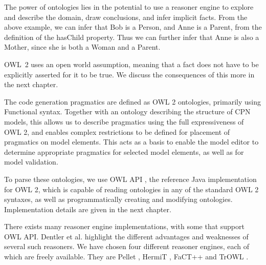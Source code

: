 The power of ontologies lies in the potential to use a reasoner engine to
explore and describe the domain, draw conclusions, and infer implicit facts.
From the above example, we can infer that Bob is a Person, and Anne is a Parent,
from the definition of the hasChild property. Thus we can further infer that
Anne is also a Mother, since she is both a Woman and a Parent.

OWL~2 uses an open world assumption, meaning that a fact does not have to be
explicitly asserted for it to be true. We discuss the consequences of this more
in the next chapter.

The code generation pragmatics are defined as OWL 2 ontologies, primarily using
Functional syntax. Together with an ontology describing the structure of CPN
models, this allows us to describe pragmatics using the full expressiveness of
OWL 2, and enables complex restrictions to be defined for placement of
pragmatics on model elements. This acts as a basis to enable the \thename{}
model editor to determine appropriate pragmatics for selected model elements, as
well as for model validation. 

To parse these ontologies, we use OWL API \cite{horridge2009owl}, the reference Java
implementation for OWL 2, which is capable of reading ontologies in any of the
standard OWL 2 syntaxes, as well as programmatically creating and modifying
ontologies.
Implementation details are given in the next chapter.

There exists many reasoner engine implementations, with some that support OWL
API. Dentler et al. \cite{dentler2011comparison} highlight the different
advantages and weaknesses of several such reasoners.
We have chosen four different reasoner engines, each of which are freely
available. They are Pellet \cite{sirin2007pellet}, HermiT
\cite{shearer2008hermit}, FaCT++ \cite{tsarkov2006fact++} and TrOWL
\cite{TPR2010}. 
